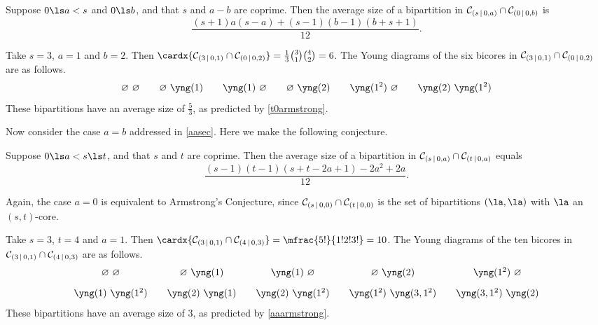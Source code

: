 \documentclass[a4paper, 11pt, twoside]{article}
\begin{document}
\begin{conj}\label{t0armstrong}
Suppose $0\ls a<s$ and $0\ls b$, and that $s$ and $a-b$ are coprime. Then the average size of a bipartition in $\mathcal{C}_{(s\,|\,0,a)}\cap\mathcal{C}_{(0\,|\,0,b)}$ is
\[
\frac{(s+1)a(s-a)+(s-1)(b-1)(b+s+1)}{12}.
\]
\end{conj}

\begin{eg}
\Yboxdim{7pt}
Take $s=3$, $a=1$ and $b=2$. Then $\cardx{\bc31\cap\bc02}=\frac13\binom31\binom42=6$. The Young diagrams of the six bicores in $\mathcal{C}_{(3\,|\,0,1)}\cap\mathcal{C}_{(0\,|\,0,2)}$ are as follows.
\[
\varnothing\ \varnothing\qquad\varnothing\ \yng(1)\qquad\yng(1)\ \varnothing\qquad\varnothing\ \yng(2)\qquad\yng(1^2)\ \varnothing\qquad\yng(2)\ \yng(1^2)
\]
These bipartitions have an average size of $\frac53$, as predicted by \cref{t0armstrong}.
\end{eg}

Now consider the case $a=b$ addressed in \cref{aasec}. Here we make the following conjecture.

\begin{conj}\label{aaarmstrong}
Suppose $0\ls a<s\ls t$, and that $s$ and $t$ are coprime. Then the average size of a bipartition in $\mathcal{C}_{(s\,|\,0,a)}\cap\mathcal{C}_{(t\,|\,0,a)}$ equals
\[
\frac{(s-1)(t-1)(s+t-2a+1)-2a^2+2a}{12}.
\]
%
\end{conj}

Again, the case $a=0$ is equivalent to Armstrong's Conjecture, since $\mathcal{C}_{(s\,|\,0,0)}\cap\mathcal{C}_{(t\,|\,0,0)}$ is the set of bipartitions $(\la,\la)$ with $\la$ an $(s,t)$-core.

\begin{eg}
\Yboxdim{7pt}
Take $s=3$, $t=4$ and $a=1$. Then $\cardx{\bc31\cap\bc43}=\mfrac{5!}{1!2!3!}=10$. The Young diagrams of the ten bicores in $\mathcal{C}_{(3\,|\,0,1)}\cap\mathcal{C}_{(4\,|\,0,3)}$ are as follows.
\[
\begin{array}{c@{\qquad}c@{\qquad}c@{\qquad}c@{\qquad}c}
\varnothing\ \varnothing&\varnothing\ \yng(1)&\yng(1)\ \varnothing&\varnothing\ \yng(2)&\yng(1^2)\ \varnothing
\\[9pt]
\yng(1)\ \yng(1^2)&\yng(2)\ \yng(1)&\yng(2)\ \yng(1^2)&\yng(1^2)\ \yng(3,1^2)&\yng(3,1^2)\ \yng(2)
\end{array}
\]
These bipartitions have an average size of $3$, as predicted by \cref{aaarmstrong}.
\end{eg}
\end{document}
